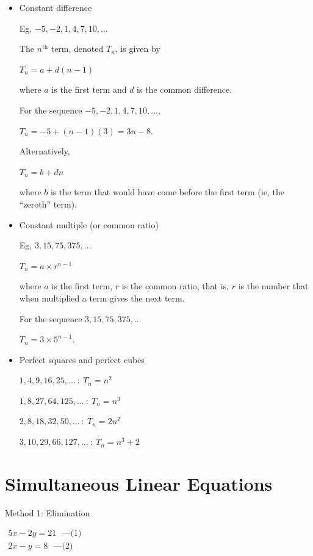\documentclass[twocolumn]{article}
\begin{document}
\begin{itemize}  
	
\item Constant difference

Eg, $-5, -2, 1, 4, 7, 10, \ldots$

The $n^{\text{th}}$ term, denoted $T_n$, is given by

$T_n = a + d(n-1)$

where $a$ is the first term and $d$ is the common difference.

For the sequence $-5, -2, 1, 4, 7, 10, \ldots$, 

$T_n = -5 + (n-1)(3) = 3n - 8$.

Alternatively,

$T_n = b + dn$

where $b$ is the term that would have come before the first term (ie, the ``zeroth'' term).

\item Constant multiple (or common ratio)

Eg, $3, 15, 75, 375, \ldots$

$T_n = a \times r^{n-1}$

where $a$ is the first term, $r$ is the common ratio, that is, $r$ is the number that when multiplied a term gives the next term.

For the sequence $3, 15, 75, 375, \ldots$

$T_n = 3 \times 5^{n-1}$.

\item Perfect squares and perfect cubes

$1, 4, 9, 16, 25, \ldots \ : \ T_n = n^2$

$1, 8, 27, 64, 125, \ldots \ : \ T_n = n^3$

$2, 8, 18, 32, 50, \ldots \ : \ T_n = 2n^2$

$3, 10, 29, 66, 127, \ldots \ : \ T_n = n^3+2$
	
\end{itemize}  	

\section*{Simultaneous Linear Equations}

Method 1: Elimination

$
\begin{gathered}
	5 x-2 y=21 \ \ \ \text{---(1)}\\
	2 x-y=8 \ \ \ \text{---(2)}
\end{gathered}
$
\end{document}
